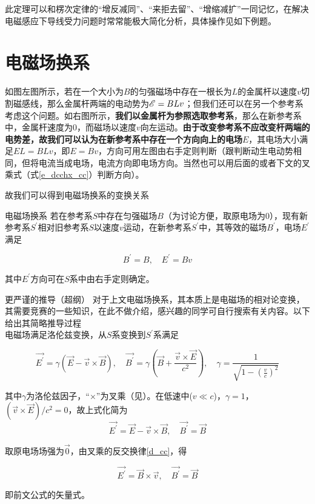 此定理可以和楞次定律的“增反减同”、“来拒去留”、“增缩减扩”一同记忆，在解决电磁感应下导线受力问题时常常能极大简化分析，具体操作见如下例题。

\section{电磁场换系}
\label{s_dcchx}



如图左图所示，若在一个大小为$B$的匀强磁场中存在一根长为$L$的金属杆以速度$v$切割磁感线，那么金属杆两端的电动势为$\mathscr{E} = B L v$；但我们还可以在另一个参考系考虑这个问题。如右图所示，\textbf{我们以金属杆为参照选取参考系}，那么在新参考系中，金属杆速度为$0$，而磁场以速度$v$向左运动。\textbf{由于改变参考系不应改变杆两端的电势差，故我们可以认为在新参考系中存在一个方向向上的电场$E$}，其电场大小满足$E L = B L v$，即$E = B v$，方向可用左图由右手定则判断（跟判断动生电动势相同，但将电流当成电场，电流方向即电场方向。当然也可以用后面的或者下文的叉乘式（式\eqref{e_dcchx_cc}）判断方向）。

故我们可以得到电磁场换系的变换关系

\begin{theo}[label=d_dcchx]{电磁场换系}{}
若在参考系$S$中存在匀强磁场$B$（为讨论方便，取原电场为0），现有新参考系$S^{\prime}$相对旧参考系$S$以速度$v$运动，在新参考系$S^{\prime}$中，其等效的磁场$B^{\prime}$，电场$E^{\prime}$满足

$$B^{\prime} = B, \quad E^{\prime} = B v$$

其中$E^{\prime}$方向可在$S$系中由右手定则确定。

\end{theo}

\begin{mk}{更严谨的推导（超纲）}{}
对于上文电磁场换系，其本质上是电磁场的相对论变换，其需要竞赛的一些知识，在此不做介绍，感兴趣的同学可自行搜索有关内容。以下给出其简略推导过程
~\\

电磁场满足洛伦兹变换，从$S$系变换到$S^{\prime}$系满足

$$\vec{E^{\prime}} = \gamma (\vec{E} - \vec{v} \times \vec{B}), \quad \vec{B^{\prime}} = \gamma (\vec{B} +\frac{\vec{v} \times \vec{E}}{c^2}), \quad \gamma = \frac{1}{\sqrt{1-(\frac{v}{c})^2}}$$

其中$\gamma$为洛伦兹因子，“$\times$”为叉乘（见）。在低速中($v \ll c$)，$\gamma = 1$，$(\vec{v} \times \vec{E})/c^2 = 0$，故上式化简为
$$\vec{E^{\prime}} = \vec{E} - \vec{v} \times \vec{B}, \quad \vec{B^{\prime}} = \vec{B}$$

取原电场场强为$\vec{0}$，由叉乘的反交换律\eqref{d_cc}，得

\begin{equation}
\label{e_dcchx_cc}
\boxed{\vec{E^{\prime}} = \vec{B} \times \vec{v}, \quad \vec{B^{\prime}} = \vec{B}}
\end{equation}

即前文公式的矢量式。
\end{mk}

